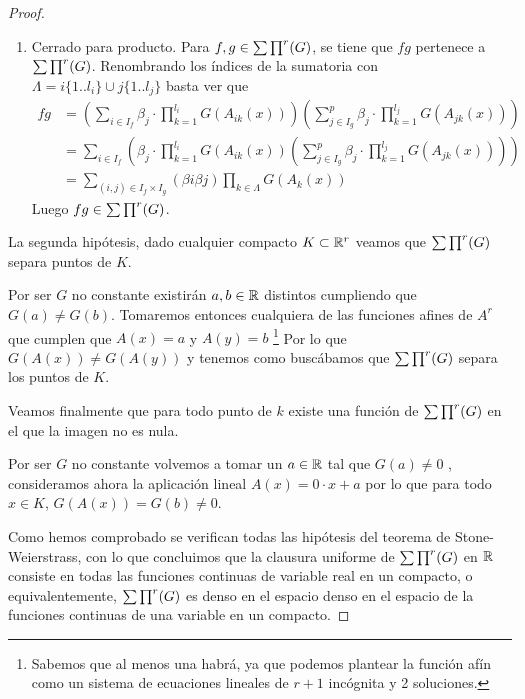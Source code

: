 \begin{proof}
\begin{enumerate}
        \item Cerrado para producto. Para $f,g \in \sum \prod^r (G)$, se tiene que $fg$ pertenece a $\sum \prod^r (G)$. 
        Renombrando los índices de la sumatoria con $\Lambda = i\{1..l_i\} \cup j\{1..l_j\}$ basta ver que 
        \begin{equation}
            \begin{split}
                fg &= \left(\sum_{i \in I_f} \beta_{j} \cdot \prod_{k=1}^{l_{i}}  G(A_{ik}(x))\right)
                    \left(\sum_{j \in I_g} ^p  \beta_{j} \cdot \prod_{k=1}^{l_{j}} G(A_{jk}(x)) \right) \\
                    & = \sum_{i \in I_f} \left(  \beta_{j} \cdot \prod_{k=1}^{l_{i}}  G(A_{ik}(x))
                        \left( \sum_{j \in I_g} ^p  \beta_{j} \cdot \prod_{k=1}^{l_{j}} G(A_{jk}(x))  \right)  
                     \right) \\
                    & =  \sum_{(i,j) \in I_f \times I_g} (\beta{i}\beta{j}) \prod_{k \in \Lambda} G(A_{k}(x))
            \end{split}
        \end{equation}
        Luego $fg \in \sum \prod^r (G)$. 
    \end{enumerate}

    La segunda hipótesis, dado cualquier compacto $K \subset \mathbb{R}^r$ veamos que $\sum \prod^r (G)$ separa puntos de $K$. 

    Por ser $G$ no constante existirán $a,b \in \mathbb{R}$ distintos cumpliendo que $G(a) \neq G(b)$. Tomaremos entonces cualquiera de las 
    funciones afines de $A^r$ que cumplen que $A(x) = a$ y $A(y)=b$ 
    \footnote{Sabemos que al menos una habrá, ya que podemos plantear la función afín
    como un sistema de ecuaciones lineales de $r+1$ incógnita y 2 soluciones.}
    Por lo que $G(A(x)) \neq G(A(y))$ y tenemos como buscábamos que $\sum \prod^r (G)$ separa los puntos de $K$. 

    Veamos finalmente que para todo punto de $k$ existe una función de $\sum \prod^r (G)$  en el que la imagen no es nula.  

    Por ser $G$ no constante volvemos a tomar un $a \in \mathbb{R}$ tal que $G(a) \neq 0$ , consideramos ahora la aplicación lineal
    $A(x) = 0 \cdot x + a$ por lo que para todo $x \in K$, $G(A(x)) = G(b) \neq 0$. 

    Como hemos comprobado se verifican todas las hipótesis del teorema de Stone-Weierstrass, con lo que concluimos que 
    la clausura uniforme de $\sum \prod^r (G)$ en $\mathbb{R}$ consiste en todas las funciones continuas de variable real en un compacto,
     o equivalentemente, $\sum \prod^r (G)$ es denso en el espacio denso en el  espacio de la funciones continuas de una variable en un compacto. 
\end{proof}

